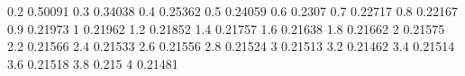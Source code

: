 0.2	0.50091
0.3	0.34038
0.4	0.25362
0.5	0.24059
0.6	0.2307
0.7	0.22717
0.8	0.22167
0.9	0.21973
1	0.21962
1.2	0.21852
1.4	0.21757
1.6	0.21638
1.8	0.21662
2	0.21575
2.2	0.21566
2.4	0.21533
2.6	0.21556
2.8	0.21524
3	0.21513
3.2	0.21462
3.4	0.21514
3.6	0.21518
3.8	0.215
4	0.21481

